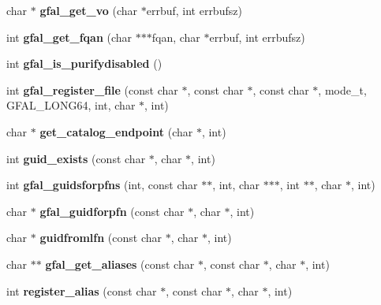 \begin{CompactItemize}
\item 
char $\ast$ \textbf{gfal\_\-get\_\-vo} (char $\ast$errbuf, int errbufsz)\label{group__internal__group_g1d7294ee456d16c8b1bf40f97ffb5081}

\item 
int \textbf{gfal\_\-get\_\-fqan} (char $\ast$$\ast$$\ast$fqan, char $\ast$errbuf, int errbufsz)\label{group__internal__group_g54b4e29078838583c8022630ef5a2ed3}

\item 
int \textbf{gfal\_\-is\_\-purifydisabled} ()\label{group__internal__group_g3a35f0e6f616c5108f95cfffd557db77}

\item 
int \textbf{gfal\_\-register\_\-file} (const char $\ast$, const char $\ast$, const char $\ast$, mode\_\-t, GFAL\_\-LONG64, int, char $\ast$, int)\label{group__internal__group_gdb09f20d086253b45c5d2896be95b4a9}

\item 
char $\ast$ \textbf{get\_\-catalog\_\-endpoint} (char $\ast$, int)\label{gfal__common_8h_b3b834ff96e3d42df0404a02a9f8d1f5}

\item 
int \textbf{guid\_\-exists} (const char $\ast$, char $\ast$, int)\label{gfal__common_8h_7aea3a7b0803552b8f2a441f57d900a3}

\item 
int \textbf{gfal\_\-guidsforpfns} (int, const char $\ast$$\ast$, int, char $\ast$$\ast$$\ast$, int $\ast$$\ast$, char $\ast$, int)\label{group__internal__group_g72f2d9fb6a55816f243a4c57c5369fe5}

\item 
char $\ast$ \textbf{gfal\_\-guidforpfn} (const char $\ast$, char $\ast$, int)\label{group__internal__group_g86568afb8c7f9b0d6944de793a3e867a}

\item 
char $\ast$ \textbf{guidfromlfn} (const char $\ast$, char $\ast$, int)\label{gfal__common_8h_47c91fab6a02d32fcc1c6d6a53ba2ce3}

\item 
char $\ast$$\ast$ \textbf{gfal\_\-get\_\-aliases} (const char $\ast$, const char $\ast$, char $\ast$, int)\label{group__internal__group_g25d4ae6bef6570590efbc8548e7d79e2}

\item 
int \textbf{register\_\-alias} (const char $\ast$, const char $\ast$, char $\ast$, int)\label{gfal__common_8h_8a3be4d56dcedebe98cf84e8d5082782}


\end{CompactItemize}
